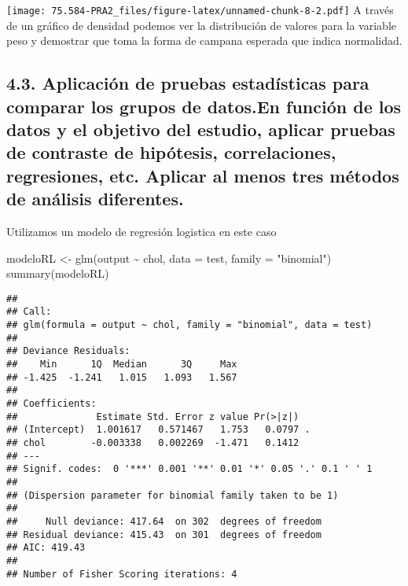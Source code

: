 \documentclass[
]{article}
\newenvironment{Shaded}{\begin{snugshade}}{\end{snugshade}}
\newcommand{\AttributeTok}[1]{\textcolor[rgb]{0.80,0.80,0.80}{#1}}
\newcommand{\FunctionTok}[1]{\textcolor[rgb]{0.94,0.94,0.56}{#1}}
\newcommand{\NormalTok}[1]{\textcolor[rgb]{0.80,0.80,0.80}{#1}}
\newcommand{\OtherTok}[1]{\textcolor[rgb]{0.94,0.94,0.56}{#1}}
\newcommand{\SpecialCharTok}[1]{\textcolor[rgb]{0.86,0.64,0.64}{#1}}
\newcommand{\StringTok}[1]{\textcolor[rgb]{0.80,0.58,0.58}{#1}}
\begin{document}
\texttt{[image: 75.584-PRA2\_files/figure-latex/unnamed-chunk-8-2.pdf]} A
través de un gráfico de densidad podemos ver la distribución de valores
para la variable peso y demostrar que toma la forma de campana esperada
que indica normalidad.

\hypertarget{aplicaciuxf3n-de-pruebas-estaduxedsticas-para-comparar-los-grupos-de-datos.en-funciuxf3n-de-los-datos-y-el-objetivo-del-estudio-aplicar-pruebas-de-contraste-de-hipuxf3tesis-correlaciones-regresiones-etc.-aplicar-al-menos-tres-muxe9todos-de-anuxe1lisis-diferentes.}{%
\subsection{4.3. Aplicación de pruebas estadísticas para comparar los
grupos de datos.En función de los datos y el objetivo del estudio,
aplicar pruebas de contraste de hipótesis, correlaciones, regresiones,
etc. Aplicar al menos tres métodos de análisis
diferentes.}\label{aplicaciuxf3n-de-pruebas-estaduxedsticas-para-comparar-los-grupos-de-datos.en-funciuxf3n-de-los-datos-y-el-objetivo-del-estudio-aplicar-pruebas-de-contraste-de-hipuxf3tesis-correlaciones-regresiones-etc.-aplicar-al-menos-tres-muxe9todos-de-anuxe1lisis-diferentes.}}

Utilizamos un modelo de regresión logistica en este caso

\begin{Shaded}
\begin{Highlighting}[]
\NormalTok{modeloRL }\OtherTok{\textless{}{-}} \FunctionTok{glm}\NormalTok{(output }\SpecialCharTok{\textasciitilde{}}\NormalTok{ chol, }\AttributeTok{data =}\NormalTok{ test, }\AttributeTok{family =} \StringTok{"binomial"}\NormalTok{)}
\FunctionTok{summary}\NormalTok{(modeloRL)}
\end{Highlighting}
\end{Shaded}

\begin{verbatim}
## 
## Call:
## glm(formula = output ~ chol, family = "binomial", data = test)
## 
## Deviance Residuals: 
##    Min      1Q  Median      3Q     Max  
## -1.425  -1.241   1.015   1.093   1.567  
## 
## Coefficients:
##              Estimate Std. Error z value Pr(>|z|)  
## (Intercept)  1.001617   0.571467   1.753   0.0797 .
## chol        -0.003338   0.002269  -1.471   0.1412  
## ---
## Signif. codes:  0 '***' 0.001 '**' 0.01 '*' 0.05 '.' 0.1 ' ' 1
## 
## (Dispersion parameter for binomial family taken to be 1)
## 
##     Null deviance: 417.64  on 302  degrees of freedom
## Residual deviance: 415.43  on 301  degrees of freedom
## AIC: 419.43
## 
## Number of Fisher Scoring iterations: 4
\end{verbatim}
\end{document}

